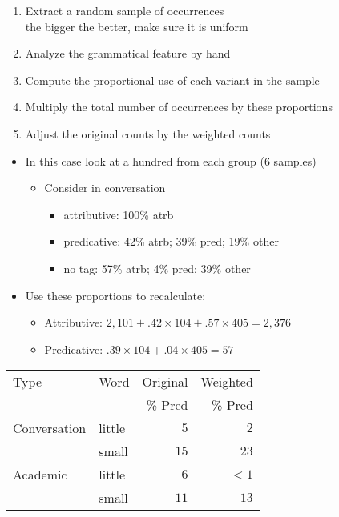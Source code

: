 \documentclass[a4paper,landscape,headrule,footrule,xetex]{foils}
\begin{document}
\MyLogo{}
\begin{enumerate}
\item Extract a random sample of occurrences
  \\ the bigger the better, make sure it is uniform
\item Analyze the grammatical feature by hand
\item Compute the proportional use of each variant in the sample
\item Multiply the total number of occurrences by these proportions
\item Adjust the original counts by the weighted counts
\end{enumerate}


\begin{itemize}
\item In this case look at a hundred from each group (6 samples)
  \begin{itemize}
  \item Consider  in conversation
    \begin{itemize}
    \item attributive: 100\% atrb
    \item predicative:   42\% atrb; 39\% pred; 19\% other
    \item no tag: 57\% atrb; 4\% pred; 39\% other
    \end{itemize}
  \end{itemize}
\item Use these proportions to recalculate:
  \begin{itemize}
  \item Attributive: $2,101 + .42\times 104 + .57 \times 405 = 2,376$
  \item Predicative: $.39\times 104 + .04 \times 405 = 57$
  \end{itemize}
\end{itemize}


\begin{tabular}{llrr}
  Type & Word & Original & Weighted \\ 
  &  & \% Pred & \%  Pred \\ 
\hline\hline
Conversation & little & $5$ & $2$ \\
             & small &  $15$ & $23$ \\
\hline
Academic & little & $6$  & $<1$\\
           & small & $11$ & $13$ \\

\end{tabular}
\end{document}
